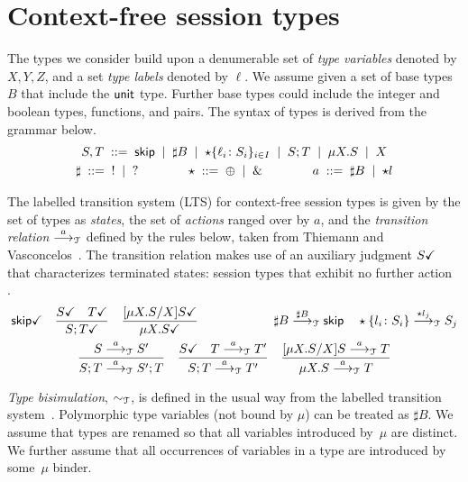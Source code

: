 \section{Context-free session types}
\label{sec:contextfreesession}

The types we consider build upon a denumerable set of \emph{type
  variables} denoted by $X,Y,Z$, and a set \emph{type labels} denoted
by $\ell$. We assume given a set of base types $B$ that include the
$\unitk$ type. Further base types could include the integer and
boolean types, functions, and pairs. The syntax of types is derived
from the grammar below.
%
\begin{gather*}
  S,T \grmeq \skipk \grmor \sharp B \grmor 
  \star\{\ell_i\colon S_i\}_{i\in I} \grmor S;T \grmor \mu X.S \grmor X
  \\
  \sharp \grmeq {}! \grmor {}? 
  \qquad \qquad
  \star  \grmeq \oplus \grmor {}\&
  \qquad \qquad
  a \grmeq \sharp B \grmor \star l %
\end{gather*}

The labelled transition system (LTS) for context-free session types is
given by the set of types as \emph{states}, the set of \emph{actions}
ranged over by $a$, and the \emph{transition relation} $\LTSderives$
defined by the rules below, taken from Thiemann and
Vasconcelos~\cite{thiemann2016context}.  The transition relation makes
use of an auxiliary judgment $\DONE{S}$ that characterizes terminated
states: session types that exhibit no further
action~\cite{DBLP:journals/jacm/AcetoH92} .
%
\begin{gather*}
  \DONE{\skipk}
  \quad
  \frac{\DONE{S} \quad \DONE{T}}{\DONE{S; T}}
  \quad
  \frac{\DONE{\subs{\mu X.S}{X} S}}{\DONE{\mu X.S}}
  \qquad \qquad \qquad
  \sharp B \LTSderives[\sharp B] \skipk
  \quad
  \star\{l_i\colon S_i\} \LTSderives[\star l_j] S_j
  \\
  \frac{S \LTSderives S'}{S; T \LTSderives S';T}
  \quad
  \frac{\DONE{S} \quad T \LTSderives T'}{S; T \LTSderives T'}
  \quad
  \frac{\subs{\mu X.S}{X}S \LTSderives T}{\mu X.S \LTSderives T}
\end{gather*}

\emph{Type bisimulation}, $\TypeEquiv$, is defined in the usual way from the
labelled transition system~\cite{sangiorgi2014introduction}.
%
Polymorphic type variables (not bound by $\mu$) can be treated as
$\sharp B$.
%
We assume that types are renamed so that all variables introduced
by~$\mu$ are distinct. We further assume that all occurrences of
variables in a type are introduced by some~$\mu$ binder.

